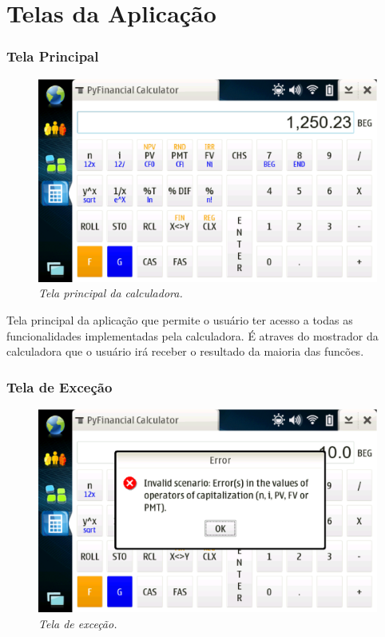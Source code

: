 \chapter{Telas da Aplicação}

\subsection{Tela Principal}

\begin{figure}[!h]
 \includegraphics[scale=0.55]{tela_principal.eps}
 \caption{\it Tela principal da calculadora.} \label{tab:tela_principal}
\end{figure}

Tela principal da aplicação que permite o usuário ter acesso a todas as funcionalidades
implementadas pela calculadora. É atraves do mostrador da calculadora que o usuário irá
receber o resultado da maioria das funcões.

\subsection{Tela de Exceção}

\begin{figure}[!h]
 \includegraphics[scale=0.55]{tela_error.eps}
 \caption{\it Tela de exceção.} \label{tab:tela_error}
\end{figure}

